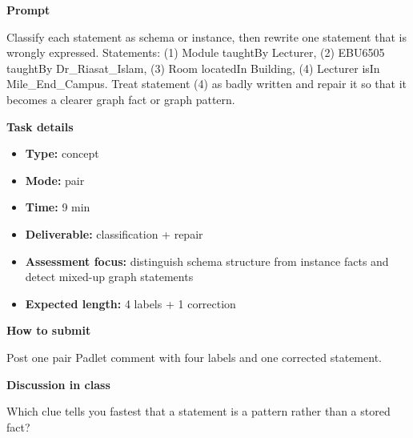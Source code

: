 \documentclass[11pt]{article}
\begin{document}
\begin{tcolorbox}[colback=white,colframe=MidnightBlue,title={Q1 Core Concept Check},fonttitle=\bfseries,breakable]
\begin{center}
\end{center}

{\large\bfseries\color{MidnightBlue} Prompt}\par\medskip
Classify each statement as schema or instance, then rewrite one statement that is wrongly expressed. Statements: (1) Module taughtBy Lecturer, (2) EBU6505 taughtBy Dr\_Riasat\_Islam, (3) Room locatedIn Building, (4) Lecturer isIn Mile\_End\_Campus. Treat statement (4) as badly written and repair it so that it becomes a clearer graph fact or graph pattern.

{\large\bfseries\color{MidnightBlue} Task details}\par\medskip
\begin{itemize}\item \textbf{Type:} concept
\item \textbf{Mode:} pair
\item \textbf{Time:} 9 min
\item \textbf{Deliverable:} classification + repair
\item \textbf{Assessment focus:} distinguish schema structure from instance facts and detect mixed-up graph statements
\item \textbf{Expected length:} 4 labels + 1 correction\end{itemize}

{\large\bfseries\color{MidnightBlue} How to submit}\par\medskip
Post one pair Padlet comment with four labels and one corrected statement.

{\large\bfseries\color{MidnightBlue} Discussion in class}\par\medskip
Which clue tells you fastest that a statement is a pattern rather than a stored fact?


\end{tcolorbox}
\end{document}
